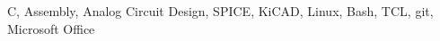 

\begin{cvhonors}

  \cvhonor
    {C, Assembly, Analog Circuit Design, SPICE, KiCAD, Linux, Bash, TCL, git, Microsoft Office} %
    {}
    {}
    {}

\end{cvhonors}
